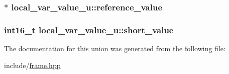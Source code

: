 \hypertarget{unionlocal__var__value__u_a90faf60bf18d81fb6caa6fbe26eca949}{
\subsubsection[{reference\+\_\+value}]{$\ast$ local\+\_\+var\+\_\+value\+\_\+u\+::reference\+\_\+value}}\label{unionlocal__var__value__u_a90faf60bf18d81fb6caa6fbe26eca949}
\hypertarget{unionlocal__var__value__u_ae5207df7130db21c87531c1fcdd331d4}{
\subsubsection[{short\+\_\+value}]{\setlength{\rightskip}{0pt plus 5cm}int16\+\_\+t local\+\_\+var\+\_\+value\+\_\+u\+::short\+\_\+value}}\label{unionlocal__var__value__u_ae5207df7130db21c87531c1fcdd331d4}


The documentation for this union was generated from the following file\+:\begin{DoxyCompactItemize}
\item 
include/\hyperlink{frame_8hpp}{frame.\+hpp}\end{DoxyCompactItemize}
